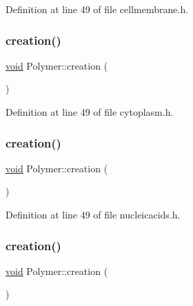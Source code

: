 Definition at line 49 of file cellmembrane.\+h.

\mbox{\label{class_polymer_a1daba3eb2ba8428bf2f3e814668b155f}} 
\subsubsection{\texorpdfstring{creation()}{creation()}\hspace{0.1cm}{\footnotesize\ttfamily [7/10]}}
{\footnotesize\ttfamily \mbox{\hyperlink{glad_8h_a950fc91edb4504f62f1c577bf4727c29}{void}} Polymer\+::creation (\begin{DoxyParamCaption}{ }\end{DoxyParamCaption})\hspace{0.3cm}{\ttfamily [inline]}}



Definition at line 49 of file cytoplasm.\+h.

\mbox{\label{class_polymer_a1daba3eb2ba8428bf2f3e814668b155f}} 
\subsubsection{\texorpdfstring{creation()}{creation()}\hspace{0.1cm}{\footnotesize\ttfamily [8/10]}}
{\footnotesize\ttfamily \mbox{\hyperlink{glad_8h_a950fc91edb4504f62f1c577bf4727c29}{void}} Polymer\+::creation (\begin{DoxyParamCaption}{ }\end{DoxyParamCaption})\hspace{0.3cm}{\ttfamily [inline]}}



Definition at line 49 of file nucleicacids.\+h.

\mbox{\label{class_polymer_a1daba3eb2ba8428bf2f3e814668b155f}} 
\subsubsection{\texorpdfstring{creation()}{creation()}\hspace{0.1cm}{\footnotesize\ttfamily [9/10]}}
{\footnotesize\ttfamily \mbox{\hyperlink{glad_8h_a950fc91edb4504f62f1c577bf4727c29}{void}} Polymer\+::creation (\begin{DoxyParamCaption}{ }\end{DoxyParamCaption})\hspace{0.3cm}{\ttfamily [inline]}}



